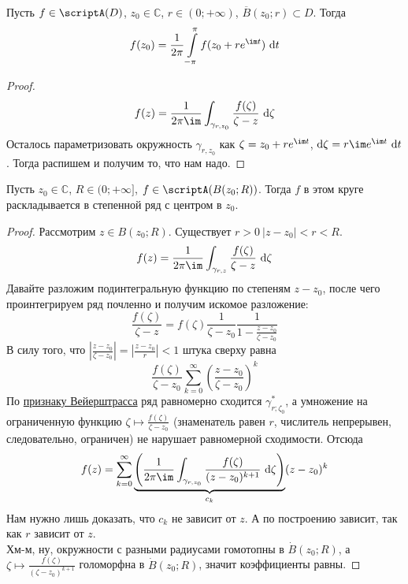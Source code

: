 \documentclass{article}
\begin{document}
    \begin{corollary}
        \label{Теорема о среднем для голоморфных функций}
        Пусть $f\in\scriptA(D)$, $z_0\in\mathbb C$, $r\in(0;+\infty)$, $\overline B(z_0;r)\subset D$. Тогда
        $$
        f(z_0)=\frac1{2\pi}\int\limits_{-\pi}^\pi f(z_0+re^{\im t})~\mathrm dt
        $$
    \end{corollary}
    \begin{proof}
        $$f(z)=\frac1{2\pi\im}\int_{\gamma_{r,z_0}}\frac{f(\zeta)}{\zeta-z}~\mathrm d\zeta$$
        Осталось параметризовать окружность $\gamma_{r,z_0}$ как $\zeta=z_0+re^{\im t}$, $\mathrm d\zeta=r\im e^{\im t}~\mathrm dt$. Тогда распишем и получим то, что нам надо.
    \end{proof}
    \begin{theorem}
        \label{Голоморфная функция аналитична}
        Пусть $z_0\in\mathbb C$, $R\in(0;+\infty]$, $f\in\scriptA(B(z_0;R))$. Тогда $f$ в этом круге раскладывается в степенной ряд с центром в $z_0$.
    \end{theorem}
    \begin{proof}
        Рассмотрим $z\in B(z_0;R)$. Существует $r>0~|z-z_0|<r<R$.
        $$
        f(z)=\frac1{2\pi\im}\int_{\gamma_{r,z}}\frac{f(\zeta)}{\zeta-z}~\mathrm d\zeta
        $$
        Давайте разложим подинтегральную функцию по степеням $z-z_0$, после чего проинтегрируем ряд почленно и получим искомое разложение:
        $$
        \frac{f(\zeta)}{\zeta-z}=f(\zeta)\frac1{\zeta-z_0}\frac1{1-\frac{z-z_0}{\zeta-z_0}}
        $$
        В силу того, что $\left|\frac{z-z_0}{\zeta-z_0}\right|=\left|\frac{z-z_0}r\right|<1$ штука сверху равна
        $$
        \frac{f(\zeta)}{\zeta-z_0}\sum\limits_{k=0}^\infty\left(\frac{z-z_0}{\zeta-z_0}\right)^k
        $$
        По \hyperref[Признак Вейерштрасса]{признаку Вейерштрасса} ряд равномерно сходится $\gamma^*_{r;\zeta_0}$, а умножение на ограниченную функцию $\zeta\mapsto\frac{f(\zeta)}{\zeta-z_0}$ (знаменатель равен $r$, числитель непрерывен, следовательно, ограничен) не нарушает равномерной сходимости. Отсюда
        $$
        f(z)=\sum\limits_{k=0}^\infty\underbrace{\left(\frac1{2\pi\im}\int_{\gamma_{r,z_0}}\frac{f(\zeta)}{(z-z_0)^{k+1}}~\mathrm d\zeta\right)}_{c_k}(z-z_0)^k
        $$
        Нам нужно лишь доказать, что $c_k$ не зависит от $z$. А по построению зависит, так как $r$ зависит от $z$.\\
        Хм-м, ну, окружности с разными радиусами гомотопны в $\dot B(z_0;R)$, а $\zeta\mapsto\frac{f(\zeta)}{(\zeta-z_0)^{k+1}}$ голоморфна в $\dot B(z_0;R)$, значит коэффициенты равны.
    \end{proof}
\end{document}
